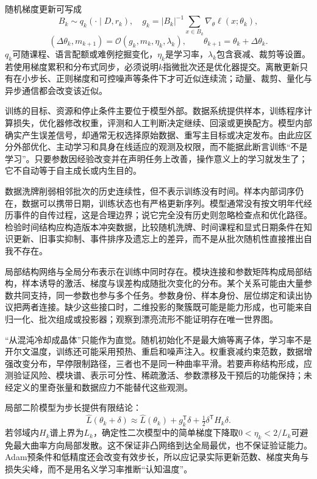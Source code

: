 随机梯度更新可写成
\[
B_k\sim q_k(\cdot\mid D,r_k),\quad
g_k=|B_k|^{-1}\sum_{x\in B_k}\nabla_\theta\ell(x;\theta_k),
\]
\[
(\Delta\theta_k,m_{k+1})=\mathcal O(g_k,m_k,\eta_k,\lambda_k),
\qquad \theta_{k+1}=\theta_k+\Delta\theta_k.
\]
$q_k$可随课程、语言配额或难例挖掘变化，$\eta_k$是学习率，$\lambda_k$包含衰减、裁剪等设置。若使用梯度累积和分布式同步，必须说明$k$指微批次还是优化器提交。离散更新只有在小步长、正则梯度和可控噪声等条件下才可近似连续流；动量、裁剪、量化与异步通信都会改变该近似。

训练的目标、资源和停止条件主要位于模型外部。数据系统提供样本，训练程序计算损失，优化器修改权重，评测和人工判断决定继续、回滚或更换配方。模型内部确实产生误差信号，却通常无权选择原始数据、重写主目标或决定发布。由此应区分外部优化、主动学习和具身在线适应的观测及权限，而不能据此断言训练“不是学习”。只要参数因经验改变并在声明任务上改善，操作意义上的学习就发生了；它不自动等于自主成长或内生目的。

数据洗牌削弱相邻批次的历史连续性，但不表示训练没有时间。样本内部词序仍在，数据可以携带日期，训练状态也有严格更新序列。模型通常没有按文明年代经历事件的自传过程，这是合理边界；说它完全没有历史则忽略检查点和优化路径。检验时间结构应构造版本冲突数据，比较随机洗牌、时间课程和显式日期条件在知识更新、旧事实抑制、事件排序及遗忘上的差异，而不是从批次随机性直接推出自我不存在。

局部结构网络与全局分布表示在训练中同时存在。模块连接和参数矩阵构成局部结构，样本诱导的激活、梯度与误差构成随批次变化的分布。某个关系可能由大量参数共同支持，同一参数也参与多个任务。参数身份、样本身份、层位绑定和读出协议把两者连接。缺少这些接口时，二维投影的聚簇既可能是能力形成，也可能来自归一化、批次组成或投影器；观察到漂亮流形不能证明存在唯一世界图。

“从混沌冷却成晶体”只能作为直觉。随机初始化不是最大熵等离子体，学习率不是开尔文温度，训练还可能采用预热、重启和噪声注入。权重衰减约束范数，数据增强改变分布，早停限制路径，三者也不是同一种曲率平滑。若要声称结构形成，应测验证风险、模块谱、表示可分性、稀疏激活、参数漂移及干预后的功能保持；未经定义的里奇张量和数据应力不能替代这些观测。

局部二阶模型为步长提供有限结论：
\[
\widehat L(\theta_k+\delta)\approx\widehat L(\theta_k)
+g_k^{\mathsf T}\delta+\tfrac12\delta^{\mathsf T}H_k\delta.
\]
若邻域内$H_k$谱上界为$L_k$，确定性二次模型中的简单梯度下降取$0<\eta_k<2/L_k$可避免最大曲率方向局部发散。这不保证非凸网络到达全局最优，也不保证验证能力。Adam预条件和低精度还会改变有效步长，所以应记录实际更新范数、梯度夹角与损失尖峰，而不是用名义学习率推断“认知温度”。

